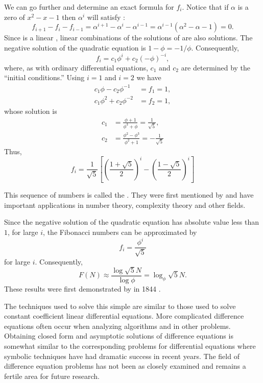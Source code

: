 We can go further and determine an exact formula for $f_i$.  Notice that if
$\alpha$ is a zero of $x^{2} -x -1$ then $\alpha^{i}$ will satisfy
: 
\[
f_{i+1} - f_{i} - f_{i-1} = \alpha^{i+1} - \alpha^{i} - \alpha^{i-1}
 = \alpha^{i-1} ( \alpha^{2} - \alpha -1) = 0.
\]
Since  is a linear ,
linear combinations of the solutions of  are also
solutions.  The negative solution of the quadratic equation is $1-\phi
= -1/\phi$. Consequently,
\[
f_i = c_1 \phi^i + c_2 (-\phi)^{-i},
\]
where, as with ordinary differential equations, $c_1$ and $c_2$ are
determined by the ``initial conditions.''  Using $i = 1$ and $i=2$ we
have
\[
\begin{aligned}
  c_1 \phi - c_2 \phi^{-1} &= f_{1} = 1,\\
  c_1 \phi^2 + c_2 \phi^{-2}&= f_{2} = 1,
\end{aligned}
\]
whose solution is
\[
\begin{aligned}
  c_1 &= \frac{\phi +1}{\phi^3 +\phi} = \frac{1}{\sqrt{5}},\\
  c_2&=\frac{\phi^2 - \phi^3}{\phi^2 + 1} = - \frac{1}{\sqrt{5}}
\end{aligned}
\]
Thus,
\[
f_i = 
\frac{1}{\sqrt{5}} \left[
\left(\frac{1 + \sqrt{5}}{2}\right)^i -
        \left(\frac{1 - \sqrt{5}}{2}\right)^i \right]
\]

This sequence of numbers is called the .  They
were first mentioned by {\Fibonacci} \cite[pages 283--285]{Fibonacci}
and have important applications in number theory, complexity theory
and other fields.

Since the negative solution of the quadratic equation has absolute
value less than $1$, for large $i$, the Fibonacci numbers can be
approximated by
\[
f_i = \frac{\phi^i}{\sqrt{5}}
\]
for large $i$. Consequently,
\[
F(N) \approx \frac{\log \sqrt{5} N}{\log \phi} = \log_{\phi} \sqrt{5} N.
\]
These results were first demonstrated  by {\Lame} in 1844 \cite{Lame44}.

The techniques used to solve this simple  are
similar to those used to solve constant coefficient linear
differential equations.  More complicated difference equations often
occur when analyzing algorithms and in other problems.  Obtaining
closed form and asymptotic solutions of difference equations is
somewhat similar to the corresponding problems for differential
equations where symbolic techniques have had dramatic success in
recent years.  The field of difference equation problems has not been
as closely examined and remains a fertile area for future research.

